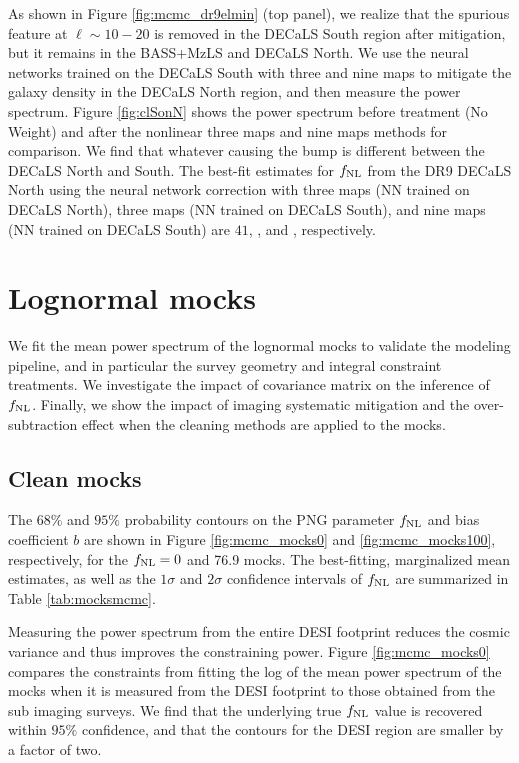 As shown in Figure \ref{fig:mcmc_dr9elmin} (top panel), we realize that the spurious feature at $\ell \sim 10-20$ is removed in the DECaLS South region after mitigation, but it remains in the BASS+MzLS and DECaLS North. We use the neural networks trained on the DECaLS South with three and nine maps to mitigate the galaxy density in the DECaLS North region, and then measure the power spectrum. Figure \ref{fig:clSonN} shows the power spectrum before treatment (No Weight) and after the nonlinear three maps and nine maps methods for comparison. We find that whatever causing the bump is different between the DECaLS North and South. The best-fit estimates for $f_{\rm NL}$ from the DR9 DECaLS North using the neural network correction with three maps (NN trained on DECaLS North), three maps (NN trained on DECaLS South), and nine maps (NN trained on DECaLS South) are $41$, , and , respectively. 


\section{Lognormal mocks}

We fit the mean power spectrum of the lognormal mocks to validate the modeling pipeline, and in particular the survey geometry and integral constraint treatments. We investigate the impact of covariance matrix on the inference of $f_{\rm NL}$. Finally, we show the impact of imaging systematic mitigation and the over-subtraction effect when the cleaning methods are applied to the mocks. 

\subsection{Clean mocks}
The $68\%$ and $95\%$ probability contours on the PNG parameter $f_{\rm NL}$ and bias coefficient $b$ are shown in Figure \ref{fig:mcmc_mocks0} and \ref{fig:mcmc_mocks100}, respectively, for the $f_{\rm NL}=0$ and 76.9 mocks. The best-fitting, marginalized mean estimates, as well as the $1\sigma$ and $2\sigma$ confidence intervals of $f_{\rm NL}$ are summarized in Table \ref{tab:mocksmcmc}. 

Measuring the power spectrum from the entire DESI footprint reduces the cosmic variance and thus improves the constraining power. Figure \ref{fig:mcmc_mocks0} compares the constraints from fitting the log of the mean power spectrum of the mocks when it is measured from the DESI footprint to those obtained from the sub imaging surveys. We find that the underlying true $f_{\rm NL}$ value is recovered within $95\%$ confidence, and that the contours for the DESI region are smaller by a factor of two. 

